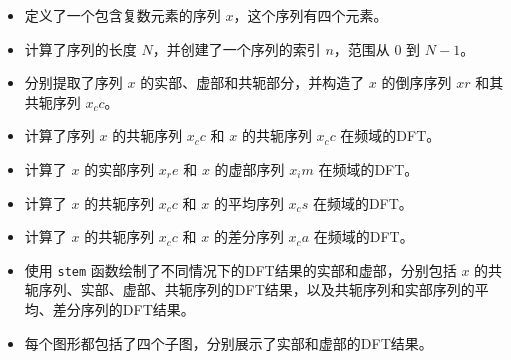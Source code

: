 \documentclass[a4paper,12pt]{article}
\begin{document}
\begin{itemize}
    \item 定义了一个包含复数元素的序列 \( x \)，这个序列有四个元素。
    \item 计算了序列的长度 \( N \)，并创建了一个序列的索引 \( n \)，范围从 0 到 \( N-1 \)。
    \item 分别提取了序列 \( x \) 的实部、虚部和共轭部分，并构造了 \( x \) 的倒序序列 \( xr \) 和其共轭序列 \( x_cc \)。
    \item 计算了序列 \( x \) 的共轭序列 \( x_cc \) 和 \( x \) 的共轭序列 \( x_cc \) 在频域的DFT。
    \item 计算了 \( x \) 的实部序列 \( x_re \) 和 \( x \) 的虚部序列 \( x_im \) 在频域的DFT。
    \item 计算了 \( x \) 的共轭序列 \( x_cc \) 和 \( x \) 的平均序列 \( x_cs \) 在频域的DFT。
    \item 计算了 \( x \) 的共轭序列 \( x_cc \) 和 \( x \) 的差分序列 \( x_ca \) 在频域的DFT。
    \item 使用 \texttt{stem} 函数绘制了不同情况下的DFT结果的实部和虚部，分别包括 \( x \) 的共轭序列、实部、虚部、共轭序列的DFT结果，以及共轭序列和实部序列的平均、差分序列的DFT结果。
    \item 每个图形都包括了四个子图，分别展示了实部和虚部的DFT结果。
\end{itemize}
\end{document}
